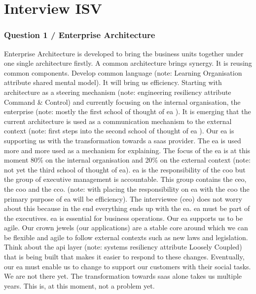 \section{Interview ISV}
\subsubsection{Question 1 / Enterprise Architecture}
Enterprise Architecture is developed to bring the business units together under one single architecture firstly. A common architecture brings synergy. It is reusing common components. Develop common language (note: Learning Organisation attribute shared mental model). It will bring us efficiency. Starting with architecture as a steering mechanism (note: engineering \gls{resiliency} attribute Command \& Control) and currently focusing on the internal organisation, the enterprise (note: mostly the first school of thought of \acrshort{ea} \parencite{Lapalme2012}). It is emerging that the current architecture is used as a communication mechanism to the external context (note: first steps into the second school of thought of \acrshort{ea} \parencite{Lapalme2012}). Our \acrshort{ea} is supporting us with the transformation towards a \acrfull{saas} provider. The \acrshort{ea} is used more and more used as a mechanism for explaining. The focus of the \acrshort{ea} is at this moment 80\% on the internal organisation and 20\% on the external context (note: not yet the third school of thought of \acrshort{ea}).
\acrshort{ea} is the responsibility of the \acrfull{coo} but the group of executive management is accountable. This group contains the \acrfull{ceo}, the \acrshort{coo} and the \acrfull{cco}. (note: with placing the responsibility on \acrshort{ea} with the \acrshort{coo} the primary purpose of \acrshort{ea} will be efficiency). The interviewee (\acrshort{ceo}) does not worry about this because in the end everything ends up with the \acrshort{ea}. \acrshort{ea} must be part of the executives. \acrshort{ea} is essential for business operations.
Our \acrshort{ea} supports us to be agile. Our crown jewels (our applications) are a stable core around which we can be flexible and agile to follow external contexts such as new laws and legislation. Think about the \acrfull{api} layer (note: systems \gls{resiliency} attribute Loosely Coupled) that is being built that makes it easier to respond to these changes. Eventually, our \acrshort{ea} must enable us to change to support our customers with their social tasks. We are not there yet. The transformation towards \acrfull{saas} alone takes us multiple years. This is, at this moment, not a problem yet.
